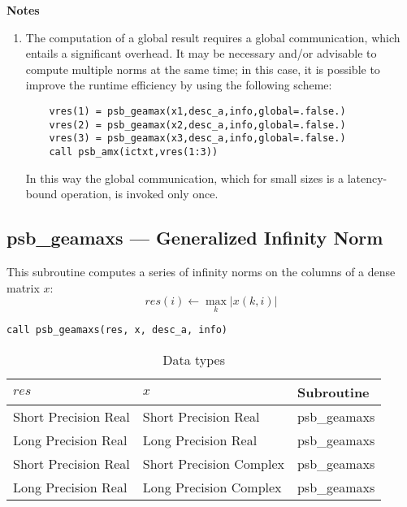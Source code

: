 {\par\noindent\large\bfseries Notes}
\begin{enumerate}
\item The computation of a global result requires a global
  communication, which entails a significant overhead. It may be
  necessary and/or advisable to compute multiple norms at the same 
  time; in this case, it is possible to improve the runtime efficiency
  by using the following scheme:
  \begin{lstlisting}
    vres(1) = psb_geamax(x1,desc_a,info,global=.false.)
    vres(2) = psb_geamax(x2,desc_a,info,global=.false.)
    vres(3) = psb_geamax(x3,desc_a,info,global=.false.)
    call psb_amx(ictxt,vres(1:3))
  \end{lstlisting}
  In this way the global communication, which for small sizes is a
  latency-bound operation, is invoked only once.
\end{enumerate}

%
%

\clearpage\subsection*{psb\_geamaxs --- Generalized Infinity Norm}

This subroutine computes a series of  infinity norms on the columns of
a  dense matrix  $x$: 
\[ res(i) \leftarrow \max_k |x(k,i)| \]

\begin{verbatim}
call psb_geamaxs(res, x, desc_a, info)
\end{verbatim}

\begin{table}[h]
\begin{center}
\begin{tabular}{lll}
\hline
$res$&  $x$& {\bf Subroutine}\\
\hline
Short Precision Real    &Short Precision Real    & psb\_geamaxs\\
Long Precision Real    &Long Precision Real    & psb\_geamaxs\\
Short Precision Real &Short Precision Complex & psb\_geamaxs\\	
Long Precision Real &Long Precision Complex & psb\_geamaxs\\	
\hline
\end{tabular}
\end{center}
\caption{Data types\label{tab:f90mamax}}
\end{table}

